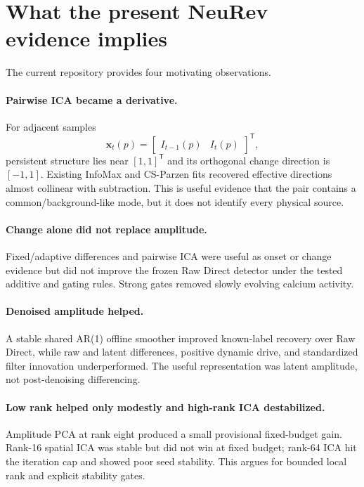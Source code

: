 \documentclass[11pt]{article}
\newcommand{\trans}{\mathsf T}
\begin{document}
\section{What the present NeuRev evidence implies}

The current repository provides four motivating observations.

\paragraph{Pairwise ICA became a derivative.}
For adjacent samples
\begin{equation}
\bm x_t(p)=
\begin{bmatrix}I_{t-1}(p)&I_t(p)\end{bmatrix}^{\trans},
\end{equation}
persistent structure lies near $[1,1]^{\trans}$ and its orthogonal change
direction is $[-1,1]$. Existing InfoMax and CS-Parzen fits recovered effective
directions almost collinear with subtraction. This is useful evidence that the
pair contains a common/background-like mode, but it does not identify every
physical source.

\paragraph{Change alone did not replace amplitude.}
Fixed/adaptive differences and pairwise ICA were useful as onset or change
evidence but did not improve the frozen Raw Direct detector under the tested
additive and gating rules. Strong gates removed slowly evolving calcium
activity.

\paragraph{Denoised amplitude helped.}
A stable shared AR(1) offline smoother improved known-label recovery over Raw
Direct, while raw and latent differences, positive dynamic drive, and
standardized filter innovation underperformed. The useful representation was
latent amplitude, not post-denoising differencing.

\paragraph{Low rank helped only modestly and high-rank ICA destabilized.}
Amplitude PCA at rank eight produced a small provisional fixed-budget gain.
Rank-16 spatial ICA was stable but did not win at fixed budget; rank-64 ICA hit
the iteration cap and showed poor seed stability. This argues for bounded local
rank and explicit stability gates.
\end{document}
